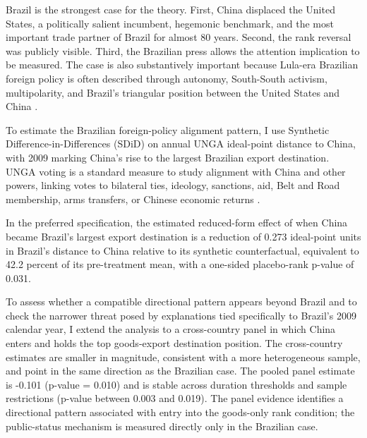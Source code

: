 \documentclass[referee,pdflatex,sn-basic]{sn-jnl}
\theoremstyle{thmstylethree}
\begin{document}
Brazil is the strongest case for the theory. First, China displaced the United States, a politically salient incumbent, hegemonic benchmark, and the most important trade partner of Brazil for almost 80 years. Second, the rank reversal was publicly visible. Third, the Brazilian press allows the attention implication to be measured. The case is also substantively important because Lula-era Brazilian foreign policy is often described through autonomy, South-South activism, multipolarity, and Brazil's triangular position between the United States and China \citep{neto2011, neto_malamud2015, rodrigues2019measuring, schenoniMythsMultipolaritySources2022, guilhon2014, schenoni_leiva2021, brun_covarrubias2024, coutinho_rodriguez2024}.

To estimate the Brazilian foreign-policy alignment pattern, I use Synthetic Difference-in-Differences (SDiD) on annual UNGA ideal-point distance to China, with 2009 marking China's rise to the largest Brazilian export destination. UNGA voting is a standard measure to study alignment with China and other powers, linking votes to bilateral ties, ideology, sanctions, aid, Belt and Road membership, arms transfers, or Chinese economic returns \citep{potrafke2009, dreher_jensen2013, struver2016, yan_zhou2021, garcia_herrero_etal2024, steinert_weyrauch2024, he_zheng_chen2025, lektzian_biglaiser2023}.

In the preferred specification, the estimated reduced-form effect of when China became Brazil's largest export destination is a reduction of 0.273 ideal-point units in Brazil's distance to China relative to its synthetic counterfactual, equivalent to 42.2 percent of its pre-treatment mean, with a one-sided placebo-rank p-value of 0.031.

To assess whether a compatible directional pattern appears beyond Brazil and to check the narrower threat posed by explanations tied specifically to Brazil's 2009 calendar year, I extend the analysis to a cross-country panel in which China enters and holds the top goods-export destination position. The cross-country estimates are smaller in magnitude, consistent with a more heterogeneous sample, and point in the same direction as the Brazilian case. The pooled panel estimate is -0.101 (p-value = 0.010) and is stable across duration thresholds and sample restrictions (p-value between 0.003 and 0.019). The panel evidence identifies a directional pattern associated with entry into the goods-only rank condition; the public-status mechanism is measured directly only in the Brazilian case.
\end{document}

